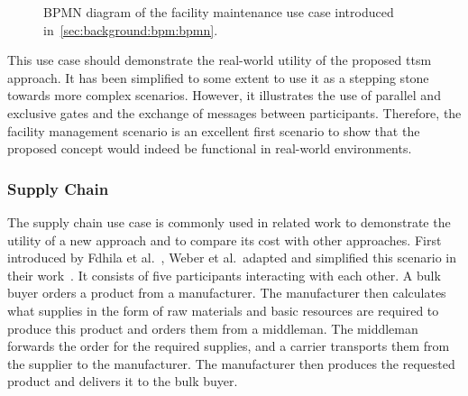 \begin{figure}[h]
    \caption{BPMN diagram of the facility maintenance use case introduced in~\ref{sec:background:bpm:bpmn}.}
    \label{fig:evaluation:simulations:maintenance_full}
\end{figure}

This use case should demonstrate the real-world utility of the proposed \gls{ttsm} approach. It has been simplified to some extent to use it as a stepping stone towards more complex scenarios. However, it illustrates the use of parallel and exclusive gates and the exchange of messages between participants. Therefore, the facility management scenario is an excellent first scenario to show that the proposed concept would indeed be functional in real-world environments.

\subsubsection{Supply Chain}
\label{sec:evaluation:simulations:descriptions:sc}
The supply chain use case is commonly used in related work to demonstrate the utility of a new approach and to compare its cost with other approaches. First introduced by Fdhila et al.~\cite{fdhila2015_change_in_collaborative_bps}, Weber et al.\ adapted and simplified this scenario in their work~\cite{untrusted_bp_execution_using_blockchain}. It consists of five participants interacting with each other. A bulk buyer orders a product from a manufacturer. The manufacturer then calculates what supplies in the form of raw materials and basic resources are required to produce this product and orders them from a middleman. The middleman forwards the order for the required supplies, and a carrier transports them from the supplier to the manufacturer. The manufacturer then produces the requested product and delivers it to the bulk buyer.

